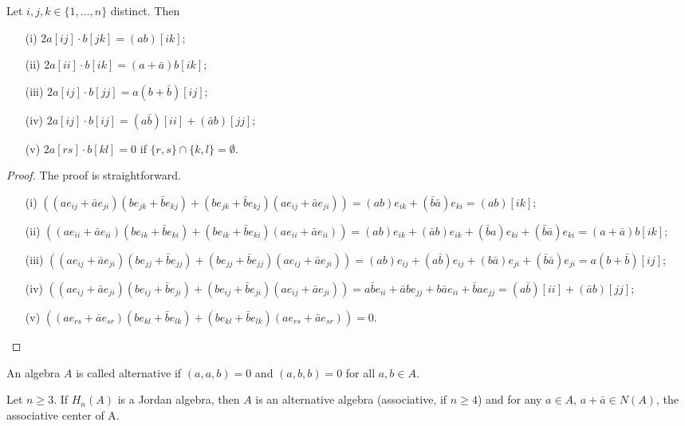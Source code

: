 \documentclass{article}
\begin{document}
\begin{lemma}  
Let $i,j,k \in \{1,\dots,n\}$ distinct. Then  
\begin{enumerate}  
    \item[(i)] $2a[ij] \cdot b[jk] = (ab)[ik]$;  
    \item[(ii)] $2a[ii] \cdot b[ik] = (a+\bar{a})b[ik]$;  
    \item[(iii)] $2a[ij] \cdot b[jj] = a(b+\bar{b})[ij]$;  
    \item[(iv)] $2a[ij] \cdot b[ij] = (a\bar{b})[ii] + (\bar{a}b)[jj]$;  
    \item[(v)] $2a[rs] \cdot b[kl] = 0$ if $\{r,s\} \cap \{k,l\} = \emptyset$.  
\end{enumerate}  
\end{lemma}  
\begin{proof}  
The proof is straightforward. 
\begin{enumerate}  
    \item[(i)] $((ae_{ij}+\bar{a}e_{ji})(be_{jk}+\bar{b}e_{kj}) + (be_{jk}+\bar{b}e_{kj})(ae_{ij}+\bar{a}e_{ji}))= (ab)e_{ik} + (\bar{b}\bar{a})e_{ki} = (ab)[ik] $;  
    \item[(ii)] $((ae_{ii}+\bar{a}e_{ii})(be_{ik}+\bar{b}e_{ki}) + (be_{ik}+\bar{b}e_{ki})(ae_{ii}+\bar{a}e_{ii}))= (ab)e_{ik} +(\bar{a}b)e_{ik} + (\bar{b}a)e_{ki} +(\bar{b}\bar{a})e_{ki}= (a+\bar{a})b[ik] $;    
    \item[(iii)] $((ae_{ij}+\bar{a}e_{ji})(be_{jj}+\bar{b}e_{jj}) + (be_{jj}+\bar{b}e_{jj})(ae_{ij}+\bar{a}e_{ji}))= (ab)e_{ij} +(a\bar{b})e_{ij} + (b\bar{a})e_{ji} +(\bar{b}\bar{a})e_{ji}= a(b+\bar{b})[ij] $; 
    \item[(iv)] $((ae_{ij}+\bar{a}e_{ji})(be_{ij}+\bar{b}e_{ji}) + (be_{ij}+\bar{b}e_{ji})(ae_{ij}+\bar{a}e_{ji})) = a\bar{b}e_{ii} + \bar{a}b e_{jj} + b\bar{a}e_{ii} + \bar{b}ae_{jj} = (a\bar{b})[ii]+(\bar{a}b)[jj]  $;
    \item[(v)] $ ((ae_{rs}+\bar{a}e_{sr})(be_{kl}+\bar{b}e_{lk}) + (be_{kl}+\bar{b}e_{lk})(ae_{rs}+\bar{a}e_{sr}))=0 $.  
\end{enumerate}
\end{proof}  

\begin{definition}  
An algebra $A$ is called alternative if $(a,a,b)=0$ and $(a,b,b)=0$ for all $a,b \in A$.  
\end{definition}  

\begin{theorem}  
Let $n \ge 3$. If $H_n(A)$ is a Jordan algebra, then $A$ is an alternative algebra (associative, if $n \ge 4$) and for any $a \in A$, $a+\bar{a} \in N(A)$, the associative center of A.  
\end{theorem}  
\end{document}
